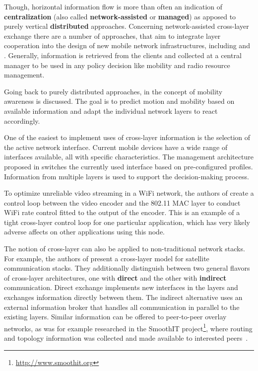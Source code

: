 Though, horizontal information flow is more than often an indication of \textbf{centralization} (also called \textbf{network-assisted} or \textbf{managed}) as apposed to purely vertical \textbf{distributed} approaches. Concerning network-assisted cross-layer exchange there are a number of approaches, that aim to integrate layer cooperation into the design of new mobile network infrastructures, including \cite{zarai2010seamless} and \cite{Piamrat20111066}. Generally, information is retrieved from the clients and collected at a central manager to be used in any policy decision like mobility and radio resource management.

Going back to purely distributed approaches, in \cite{hummel2010mobilitaet} the concept of mobility awareness is discussed. The goal is to predict motion and mobility based on available information and adapt the individual network layers to react accordingly. 

One of the easiest to implement uses of cross-layer information is the selection of the active network interface. Current mobile devices have a wide range of interfaces available, all with specific characteristics. The management architecture proposed in  \cite{Bonnin:2009:AMM:1503496.1503498} switches the currently used interface based on pre-configured profiles. Information from multiple layers is used to support the decision-making process.

To optimize unreliable video streaming in a WiFi network, the authors of \cite{1580941} create a control loop between the video encoder and the 802.11 \gls{MAC} layer to conduct WiFi rate control fitted to the output of the encoder. This is an example of a tight cross-layer control loop for one particular application, which has very likely adverse affects on other applications using this node.

The notion of cross-layer can also be applied to non-traditional network stacks. For example, the authors of \cite{4656786} present a cross-layer model for satellite communication stacks. They additionally distinguish between two general flavors of cross-layer architectures, one with \textbf{direct} and the other with \textbf{indirect} communication. Direct exchange implements new interfaces in the layers and exchanges information directly between them.  The indirect alternative uses an external information broker that handles all communication in parallel to the existing layers. Similar information can be offered to peer-to-peer overlay networks, as was for example researched in the SmoothIT project\footnote{\url{http://www.smoothit.org}}, where routing and topology information was collected and made available to interested peers~\cite{oechsner2009pushing}.


